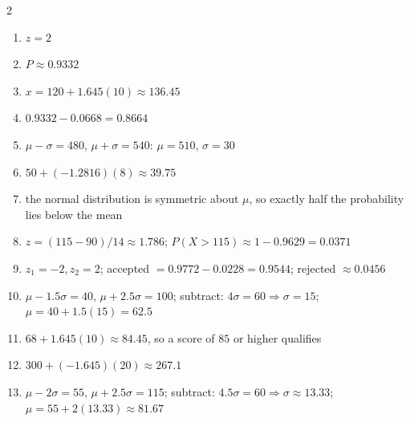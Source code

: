 \documentclass[11pt]{article}
\begin{document}
\begin{keybox}
\begin{multicols}{2}
\small
\begin{enumerate}[leftmargin=*,itemsep=3pt]
  \item $z=2$
  \item $P\approx0.9332$
  \item $x=120+1.645(10)\approx136.45$
  \item $0.9332-0.0668=0.8664$
  \item $\mu-\sigma=480$, $\mu+\sigma=540$: $\mu=510$, $\sigma=30$
  \item $50+(-1.2816)(8)\approx39.75$
  \item the normal distribution is symmetric about $\mu$, so exactly half the probability lies below the mean
  \item $z=(115-90)/14\approx1.786$; $P(X>115)\approx1-0.9629=0.0371$
  \item $z_1=-2,z_2=2$; accepted $=0.9772-0.0228=0.9544$; rejected $\approx0.0456$
  \item $\mu-1.5\sigma=40$, $\mu+2.5\sigma=100$; subtract: $4\sigma=60\Rightarrow\sigma=15$; $\mu=40+1.5(15)=62.5$
  \item $68+1.645(10)\approx84.45$, so a score of $85$ or higher qualifies
  \item $300+(-1.645)(20)\approx267.1$
  \item $\mu-2\sigma=55$, $\mu+2.5\sigma=115$; subtract: $4.5\sigma=60\Rightarrow\sigma\approx13.33$; $\mu=55+2(13.33)\approx81.67$
\end{enumerate}
\end{multicols}
\end{keybox}
\end{document}
